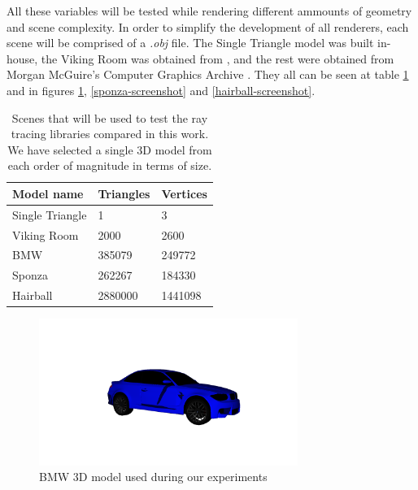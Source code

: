 All these variables will be tested while rendering different ammounts of geometry and scene complexity. In order to simplify the development of all renderers, each scene will be comprised of a \textit{.obj} file. The Single Triangle model was built in-house, the Viking Room was obtained from \cite{VulkanTutorial}, and the rest were obtained from Morgan McGuire's Computer Graphics Archive \cite{McGuire2022Data}. They all can be seen at table \ref{scenes-geometry-table} and in figures \ref{bmw-screenshot}, \ref{sponza-screenshot} and \ref{hairball-screenshot}.

\begin{center}
\begin{table}
  \begin{tabular}{ | m{3cm} | m{3cm}| m{3cm}|}
  \hline
  Model name& Triangles& Vertices\\
  \hline
    Single Triangle& 1& 3\\
  \hline
    Viking Room& 2000& 2600\\
  \hline
    BMW& 385079& 249772\\
  \hline
    Sponza& 262267& 184330\\
  \hline
    Hairball& 2880000& 1441098\\
  \hline
\end{tabular}
\label{scenes-geometry-table}
  \caption{Scenes that will be used to test the ray tracing libraries compared in this work. We have selected a single 3D model from each order of magnitude in terms of size.}
\end{table}
\end{center}

\begin{figure}[hbt!]
  \centering
  \includegraphics[width=0.75\textwidth]{figuras/bmw.png}
  \caption{BMW 3D model used during our experiments}
  \label{bmw-screenshot}
\end{figure}

